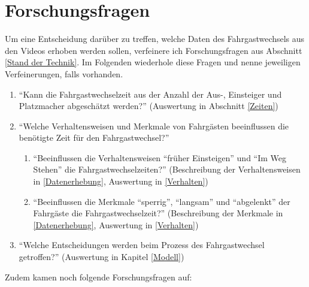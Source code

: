 \chapter{Forschungsfragen} \label{Forschungsfragen}
Um eine Entscheidung darüber zu treffen, welche Daten des Fahrgastwechsels aus den Videos erhoben werden sollen, verfeinere ich Forschungsfragen aus Abschnitt \ref{Stand der Technik}. Im Folgenden wiederhole diese Fragen und nenne jeweiligen Verfeinerungen, falls vorhanden.
\begin{enumerate}
 \item "`Kann die Fahrgastwechselzeit aus der Anzahl der Aus-, Einsteiger und Platzmacher abgeschätzt werden?"' (Auswertung in Abschnitt \ref{Zeiten}) \label{item:Fahrgastwechselzeiten}
 \item "`Welche Verhaltensweisen und Merkmale von Fahrgästen beeinflussen die benötigte Zeit für den Fahrgastwechsel?"' \label{item:Verhalten}
 	\begin{enumerate}
 		\item "`Beeinflussen die Verhaltensweisen "`früher Einsteigen"' und "`Im Weg Stehen"' die Fahrgastwechselzeiten?"' (Beschreibung der Verhaltensweisen in \ref{Datenerhebung}, Auswertung in \ref{Verhalten}) \label{item:Verhalten,Verhalten}
 		\item "`Beeinflussen die Merkmale "`sperrig"', "`langsam"' und "`abgelenkt"' der Fahrgäste die Fahrgastwechselzeit?"' (Beschreibung der Merkmale in \ref{Datenerhebung}, Auswertung in \ref{Verhalten}) \label{item:Vehalten,Merkmale}
 	\end{enumerate}
 \item "`Welche Entscheidungen werden beim Prozess des Fahrgastwechsel getroffen?"' (Auswertung in Kapitel \ref{Modell}) \label{item:Entscheidungen}
\end{enumerate}
Zudem kamen noch folgende Forschungsfragen auf:
